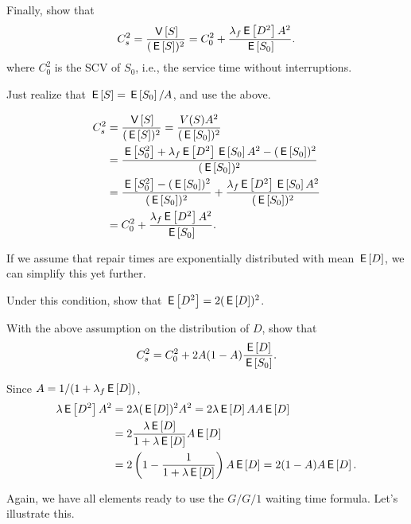 \begin{exercise}
  Finally, show that
  \begin{equation*}
    C_s^2 = \frac{\V{S}}{(\E S)^2} = C_0^2 + \frac{\lambda_f \E{D^2} A^2}{\E{S_0}}.
  \end{equation*}
where $C_0^2$ is the SCV of $S_0$, i.e., the service time without interruptions. 
\begin{hint} Just realize that $\E{S} = \E{S_0}/A$, and use the above.
\end{hint}
\begin{solution}
  \begin{align*}
C_s^2 &= \frac{\V{S}}{(\E S)^2} =\frac{V(S) A^2}{(\E{S_0})^2} \\
&=\frac{\E{S_0^2} + \lambda_f \E{D^2} \E{S_0}A^2 -(\E{S_0})^2}{(\E{S_0})^2} \\
&=\frac{\E{S_0^2} -(\E{S_0})^2}{(\E{S_0})^2} + \frac{\lambda_f \E{D^2} \E{S_0}A^2}{(\E{S_0})^2} \\
&=C_0^2 + \frac{\lambda_f \E{D^2}A^2}{\E{S_0}}.
  \end{align*}
\end{solution}
\end{exercise}

If we assume that repair times are exponentially distributed with mean $\E{D}$, we can simplify this yet further.
\begin{exercise}
  Under this condition, show that $\E{D^2}=2(\E D)^2$. 
\end{exercise}
\begin{exercise}
With the above assumption on the distribution of $D$, show that
  \begin{equation*}
    C_s^2 = C_0^2 + 2 A(1-A) \frac{\E{D}}{\E{S_0}}.
  \end{equation*}
\begin{solution} 
Since $A=1/(1+\lambda_f \E D)$, 
  \begin{equation*}
    \begin{split}
    \lambda \E{D^2} A^2 
&= 2\lambda (\E D)^2 A^2 = 2 \lambda \E D A A \E D \\
&= 2 \frac{\lambda \E D }{1+\lambda \E D} A \E D \\
&= 2 \left(1-\frac{1}{1+\lambda \E D}\right) A \E D  = 2(1-A)A \E D.
    \end{split}
  \end{equation*}
\end{solution}
\end{exercise}

Again, we have all elements ready to use the $G/G/1$ waiting time formula. Let's illustrate this. 

